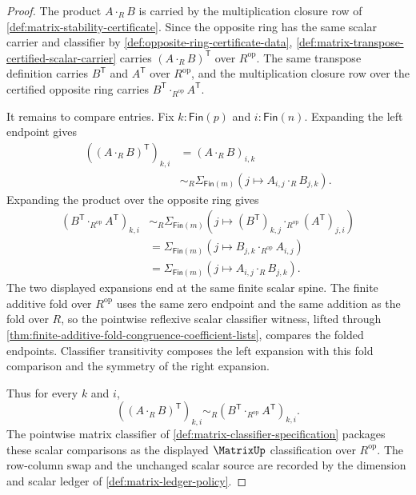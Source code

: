 \begin{proof}
The product $A\cdot_RB$ is carried by the multiplication closure row of \autoref{def:matrix-stability-certificate}. Since the opposite ring has the same scalar carrier and classifier by \autoref{def:opposite-ring-certificate-data}, \autoref{def:matrix-transpose-certified-scalar-carrier} carries $(A\cdot_RB)^{\mathsf{T}}$ over $R^{\mathrm{op}}$. The same transpose definition carries $B^{\mathsf{T}}$ and $A^{\mathsf{T}}$ over $R^{\mathrm{op}}$, and the multiplication closure row over the certified opposite ring carries $B^{\mathsf{T}}\cdot_{R^{\mathrm{op}}}A^{\mathsf{T}}$.

It remains to compare entries. Fix $k:\mathsf{Fin}(p)$ and $i:\mathsf{Fin}(n)$. Expanding the left endpoint gives
$$
\begin{aligned}
((A\cdot_RB)^{\mathsf{T}})_{k,i}
&=(A\cdot_RB)_{i,k} \\
&\sim_R
\Sigma_{\mathsf{Fin}(m)}(j\mapsto A_{i,j}\cdot_RB_{j,k}).
\end{aligned}
$$
Expanding the product over the opposite ring gives
$$
\begin{aligned}
(B^{\mathsf{T}}\cdot_{R^{\mathrm{op}}}A^{\mathsf{T}})_{k,i}
&\sim_R
\Sigma_{\mathsf{Fin}(m)}(j\mapsto (B^{\mathsf{T}})_{k,j}\cdot_{R^{\mathrm{op}}}(A^{\mathsf{T}})_{j,i}) \\
&=
\Sigma_{\mathsf{Fin}(m)}(j\mapsto B_{j,k}\cdot_{R^{\mathrm{op}}}A_{i,j}) \\
&=
\Sigma_{\mathsf{Fin}(m)}(j\mapsto A_{i,j}\cdot_RB_{j,k}).
\end{aligned}
$$
The two displayed expansions end at the same finite scalar spine. The finite additive fold over $R^{\mathrm{op}}$ uses the same zero endpoint and the same addition as the fold over $R$, so the pointwise reflexive scalar classifier witness, lifted through \autoref{thm:finite-additive-fold-congruence-coefficient-lists}, compares the folded endpoints. Classifier transitivity composes the left expansion with this fold comparison and the symmetry of the right expansion.

Thus for every $k$ and $i$,
$$
((A\cdot_RB)^{\mathsf{T}})_{k,i}
\sim_R
(B^{\mathsf{T}}\cdot_{R^{\mathrm{op}}}A^{\mathsf{T}})_{k,i}.
$$
The pointwise matrix classifier of \autoref{def:matrix-classifier-specification} packages these scalar comparisons as the displayed $\MatrixUp$ classification over $R^{\mathrm{op}}$. The row-column swap and the unchanged scalar source are recorded by the dimension and scalar ledger of \autoref{def:matrix-ledger-policy}.
\end{proof}
